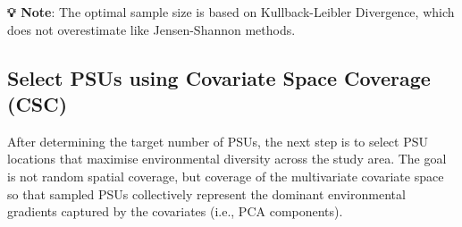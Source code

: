 \documentclass[
  10pt,
  b5paper,
  oneside]{book}
\newenvironment{Shaded}{\begin{snugshade}}{\end{snugshade}}
\newcommand{\AttributeTok}[1]{\textcolor[rgb]{0.13,0.29,0.53}{#1}}
\newcommand{\CommentTok}[1]{\textcolor[rgb]{0.56,0.35,0.01}{\textit{#1}}}
\newcommand{\DecValTok}[1]{\textcolor[rgb]{0.00,0.00,0.81}{#1}}
\newcommand{\FloatTok}[1]{\textcolor[rgb]{0.00,0.00,0.81}{#1}}
\newcommand{\FunctionTok}[1]{\textcolor[rgb]{0.13,0.29,0.53}{\textbf{#1}}}
\newcommand{\NormalTok}[1]{#1}
\newcommand{\OtherTok}[1]{\textcolor[rgb]{0.56,0.35,0.01}{#1}}
\newcommand{\SpecialCharTok}[1]{\textcolor[rgb]{0.81,0.36,0.00}{\textbf{#1}}}
\newcommand{\StringTok}[1]{\textcolor[rgb]{0.31,0.60,0.02}{#1}}
\begin{document}
\begin{Shaded}
\end{Shaded}

\textbf{💡 Note}: The optimal sample size is based on Kullback-Leibler Divergence, which does not overestimate like Jensen-Shannon methods.

\subsection{Select PSUs using Covariate Space Coverage (CSC)}\label{sec-select-psus-csc}

After determining the target number of PSUs, the next step is to select PSU locations that maximise environmental diversity across the study area. The goal is not random spatial coverage, but coverage of the multivariate covariate space so that sampled PSUs collectively represent the dominant environmental gradients captured by the covariates (i.e., PCA components).
\end{document}
